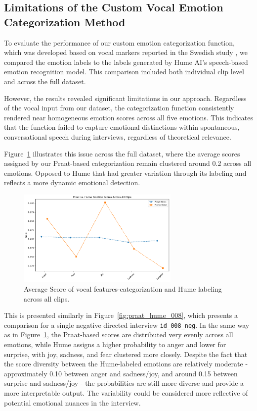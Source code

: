 \subsection{Limitations of the Custom Vocal Emotion Categorization Method}
To evaluate the performance of our custom emotion categorization function, which was developed based on vocal markers reported in the Swedish study \autocite{Ekberg2023}, we compared the emotion labels to the labels generated by Hume AI’s speech-based emotion recognition model. This comparison included both individual clip level and across the full dataset. 

However, the results revealed significant limitations in our approach. Regardless of the vocal input from our dataset, the categorization function consistently rendered near homogeneous emotion scores across all five emotions. This indicates that the function failed to capture emotional distinctions within spontaneous, conversational speech during interviews, regardless of theoretical relevance. 

Figure~\ref{fig:scatter_hume_praat} illustrates this issue across the full dataset, where the average scores assigned by our Praat-based categorization remain clustered around 0.2 across all emotions. Opposed to Hume that had greater variation through its labeling and reflects a more dynamic emotional detection.

\begin{figure}[H]
    \centering
    \includegraphics[width=0.7\textwidth]{png/results/rq1/praat_hume_all_clips_scatter.pdf}
    \caption{Average Score of vocal features-categorization and Hume labeling across all clips.}
    \label{fig:scatter_hume_praat}
\end{figure}

This is presented similarly in Figure~\ref{fig:praat_hume_008}, which presents a comparison for a single negative directed interview \texttt{id\_008\_neg}. In the same way as in Figure~\ref{fig:scatter_hume_praat}, the Praat-based scores are distributed very evenly across all emotions, while Hume assigns a higher probability to anger and lower for surprise,
with joy, sadness, and fear clustered more closely. Despite the fact that the score diversity between the Hume-labeled emotions are relatively moderate - approximately 0.10 between anger and sadness/joy, and around 0.15 between surprise and sadness/joy - the probabilities are still more diverse and provide a more interpretable output. The variability could be considered more reflective of potential emotional nuances in the interview. 

